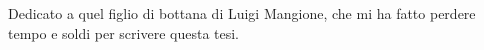 Dedicato a quel figlio di bottana di Luigi Mangione, che mi ha fatto perdere tempo e soldi per scrivere questa tesi.